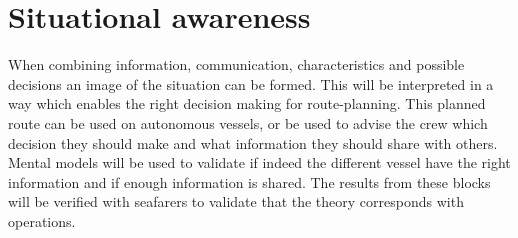 \section{Situational awareness}
When combining information, communication, characteristics and possible decisions an image of the situation can be formed. This will be interpreted in a way which enables the right decision making for route-planning. This planned route can be used on autonomous vessels, or be used to advise the crew which decision they should make and what information they should share with others. Mental models will be used to validate if indeed the different vessel have the right information and if enough information is shared. The results from these blocks will be verified with seafarers to validate that the theory corresponds with operations.

